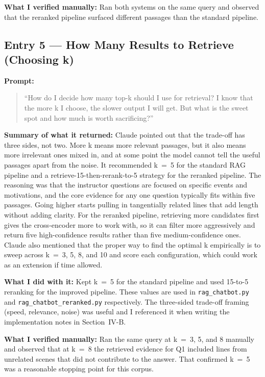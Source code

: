\documentclass[10pt,conference]{IEEEtran}
\begin{document}
\textbf{What I verified manually:}
Ran both systems on the same query and observed that the reranked
pipeline surfaced different passages than the standard pipeline.

\subsection*{Entry 5 --- How Many Results to Retrieve (Choosing k)}

\textbf{Prompt:}
\begin{quote}
``How do I decide how many top-k should I use for retrieval?
I know that the more k I choose, the slower output I will get.
But what is the sweet spot and how much is worth sacrificing?''
\end{quote}

\textbf{Summary of what it returned:}
Claude pointed out that the trade-off has three sides, not two. More k
means more relevant passages, but it also means more irrelevant ones
mixed in, and at some point the model cannot tell the useful passages
apart from the noise. It recommended k~=~5 for the standard RAG
pipeline and a retrieve-15-then-rerank-to-5 strategy for the reranked
pipeline. The reasoning was that the instructor questions are focused
on specific events and motivations, and the core evidence for any one
question typically fits within five passages. Going higher starts
pulling in tangentially related lines that add length without adding
clarity. For the reranked pipeline, retrieving more candidates first
gives the cross-encoder more to work with, so it can filter more
aggressively and return five high-confidence results rather than five
medium-confidence ones. Claude also mentioned that the proper way to
find the optimal k empirically is to sweep across k~=~3, 5, 8, and 10
and score each configuration, which could work as an extension if time
allowed.

\textbf{What I did with it:}
Kept k~=~5 for the standard pipeline and used 15-to-5 reranking for
the improved pipeline. These values are used in
\texttt{rag\_chatbot.py} and \texttt{rag\_chatbot\_reranked.py}
respectively. The three-sided trade-off framing (speed, relevance,
noise) was useful and I referenced it when writing the implementation
notes in Section~IV-B.

\textbf{What I verified manually:}
Ran the same query at k~=~3, 5, and 8 manually and observed that at
k~=~8 the retrieved evidence for Q1 included lines from unrelated
scenes that did not contribute to the answer. That confirmed k~=~5
was a reasonable stopping point for this corpus.
\end{document}
